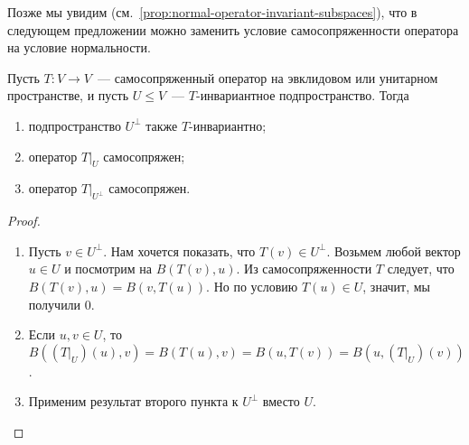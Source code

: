\begin{remark}
Позже мы увидим (см.~\ref{prop:normal-operator-invariant-subspaces}),
что в следующем предложении можно
заменить условие самосопряженности оператора на условие нормальности.
\end{remark}

\begin{proposition}\label{prop:orthogonal-complement-invariant}
Пусть $T\colon V\to V$~--- самосопряженный оператор на эвклидовом или
унитарном пространстве, и пусть $U\leq V$~--- $T$-инвариантное
подпространство.
Тогда
\begin{enumerate}
\item подпространство $U^\perp$ также $T$-инвариантно;
\item оператор $T|_U$ самосопряжен;
\item оператор $T|_{U^\perp}$ самосопряжен.
\end{enumerate}
\end{proposition}
\begin{proof}
\begin{enumerate}
\item 
Пусть $v\in U^\perp$. Нам хочется показать, что $T(v)\in U^\perp$.
Возьмем любой вектор $u\in U$ и посмотрим на $B(T(v),u)$.
Из самосопряженности $T$ следует,
что $B(T(v),u) = B(v,T(u))$. Но по условию $T(u)\in U$, значит,
мы получили $0$.
\item Если $u,v\in U$, то $B((T|_U)(u),v) = B(T(u),v) = B(u,T(v))
= B(u,(T|_U)(v))$.
\item Применим результат второго пункта к $U^\perp$ вместо $U$.
\end{enumerate}
\end{proof}

